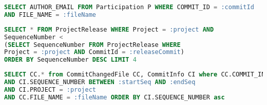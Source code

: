 \begin{latin}
\begin{lstlisting}[language=SQL]
SELECT AUTHOR_EMAIL FROM Participation P WHERE COMMIT_ID = :commitId 
AND FILE_NAME = :fileName
\end{lstlisting}
\end{latin}
\label{code:contributers}

\begin{latin}
\begin{lstlisting}[language=SQL]
SELECT * FROM ProjectRelease WHERE Project = :project AND
SequenceNumber <  
(SELECT SequenceNumber FROM ProjectRelease WHERE 
Project = :project AND CommitId = :releaseCommit) 
ORDER BY SequenceNumber DESC LIMIT 4 
\end{lstlisting}
\end{latin}
\label{code:previous-releases}



\begin{latin}
\begin{lstlisting}[language=SQL]
SELECT CC.* from CommitChangedFile CC, CommitInfo CI where CC.COMMIT_INFO_ID = CI.ID
AND CI.SEQUENCE_NUMBER BETWEEN :startSeq AND :endSeq
AND CI.PROJECT = :project
AND CC.FILE_NAME = :fileName ORDER BY CI.SEQUENCE_NUMBER asc
\end{lstlisting}
\end{latin}
\label{code:commit-during-release}
